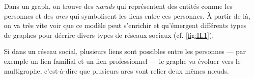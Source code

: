 
Dans un \gls{graph}, on trouve des \emph{nœuds} qui représentent des entités comme les personnes et des \emph{arcs} qui symbolisent les liens entre ces personnes. À partir de là, on va très vite voir que ce modèle peut s'enrichir et qu'émergent différents types de graphes pour décrire divers types de réseaux sociaux (cf. \cref{fig:II.1}).

Si dans un réseau social, plusieurs liens sont possibles entre les personnes --- par exemple un lien familial et un lien professionnel --- le graphe va évoluer vers le multigraphe, c'est-­à-­dire que plusieurs arcs vont relier deux mêmes nœuds.

